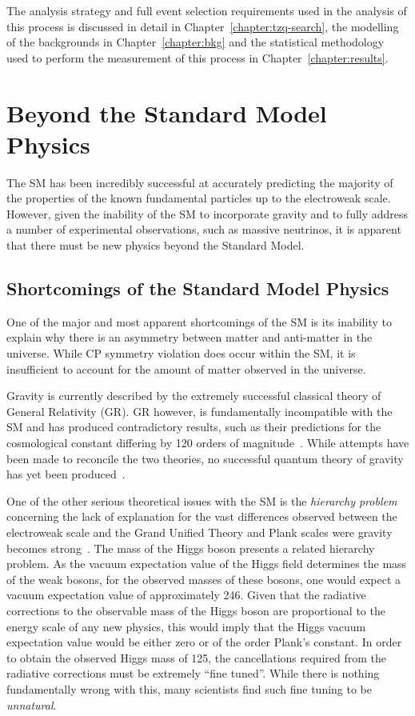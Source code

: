 The analysis strategy and full event selection requirements used in the analysis of this process is discussed in detail in Chapter~\ref{chapter:tzq-search}, the modelling of the backgrounds in Chapter~\ref{chapter:bkg} and the statistical methodology used to perform the measurement of this process in Chapter~\ref{chapter:results}.

\section{Beyond the Standard Model Physics}\label{sec:bsm}
The SM has been incredibly successful at accurately predicting the majority of the properties of the known fundamental particles up to the electroweak scale.
However, given the inability of the SM to incorporate gravity and to fully address a number of experimental observations, such as massive neutrinos, it is apparent that there must be new physics beyond the Standard Model.

\subsection{Shortcomings of the Standard Model Physics}\label{subsec:shortcomings}
One of the major and most apparent shortcomings of the SM is its inability to explain why there is an asymmetry between matter and anti-matter in the universe.
While CP symmetry violation does occur within the SM, it is insufficient to account for the amount of matter observed in the universe.

Gravity is currently described by the extremely successful classical theory of General Relativity (GR).
GR however, is fundamentally incompatible with the SM and  has produced contradictory results, such as their predictions for the cosmological constant differing by 120 orders of magnitude~\cite{Adler:1995vd}.
While attempts have been made to reconcile the two theories, no successful quantum theory of gravity has yet been produced~\cite{Sola:2013gha}.	

One of the other serious theoretical issues with the SM is the \emph{hierarchy problem} concerning the lack of explanation for the vast differences observed between the electroweak scale and the Grand Unified Theory and Plank scales were gravity becomes strong~\cite{Burdman:2007ck}.
The mass of the Higgs boson presents a related hierarchy problem.
As the vacuum expectation value of the Higgs field determines the mass of the weak bosons, for the observed masses of these bosons, one would expect a vacuum expectation value of approximately 246\GeV.
Given that the radiative corrections to the observable mass of the Higgs boson are proportional to the energy scale of any new physics, this would imply that the Higgs vacuum expectation value would be either zero or of the order Plank's constant.
In order to obtain the observed Higgs mass of 125\GeV, the cancellations required from the radiative corrections must be extremely ``fine tuned''.
While there is nothing fundamentally wrong with this, many scientists find such fine tuning to be \emph{unnatural}.

